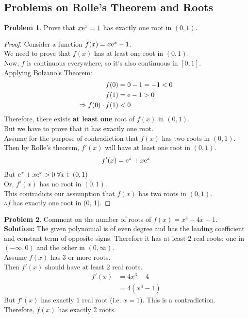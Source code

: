\documentclass[14]{article}
\theoremstyle{definition}
\newtheorem{prob}{Problem}
\begin{document}
\subsection{Problems on Rolle's Theorem and Roots}
\begin{prob}
Prove that $x {\rm e}^x = 1$ has exactly one root in $(0, 1)$.
\begin{proof}
Consider a function $f(x) = x {\rm e}^x - 1$.\\
We need to prove that $f(x)$ has at least one root in $(0, 1)$.\\
Now, $f$ is continuous everywhere, so it's also continuous in $[0, 1]$.\\
Applying Bolzano's Theorem:
\begin{align*}
f(0) &= 0 - 1 = -1 < 0\\
f(1) &= {\rm e} - 1 > 0\\
\Rightarrow f(0) \cdot f(1) &< 0
\end{align*}
Therefore, there exists \textbf{at least one} root of $f(x)$ in $(0, 1)$.\\
But we have to prove that it has exactly one root.\\
Assume for the purpose of contradiction that $f(x)$ has two roots in $(0, 1)$.\\
Then by Rolle's theorem, $f'(x)$ will have at least one root in $(0, 1)$.\\
\begin{equation*}
f'(x) = {\rm e} ^ x + x {\rm e}^x
\end{equation*}
But ${\rm e} ^ x + x {\rm e}^x > 0 \; \forall x \in (0, 1)$\\
Or, $f'(x)$ has no root in $(0, 1)$.\\ This contradicts our assumption that $f(x)$ has two roots in $(0, 1)$.\\
$\therefore f$ has exactly one root in (0, 1). 
\end{proof}
\end{prob}
\begin{prob}
Comment on the number of roots of $f(x) = x^4- 4x - 1$.\\
\textbf{Solution: } The given polynomial is of even degree and has the leading coefficient and constant term of opposite signs. Therefore it has at least 2 real roots: one in $(-\infty, 0)$ and the other in $(0, \infty)$.\\
Assume $f(x)$ has 3 or more roots.\\
Then $f'(x)$ should have at least 2 real roots.\\
\begin{align*}
f'(x) &= 4x^3 - 4\\
&= 4(x^3 - 1)
\end{align*}
But $f'(x)$ has exactly 1 real root (i.e. $x = 1$). This is a contradiction.\\
Therefore, $f(x)$ has exactly 2 roots.
\end{prob}
\end{document}
